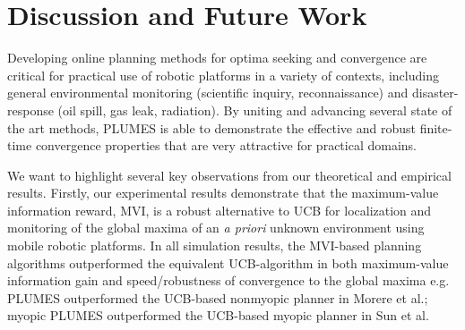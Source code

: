 \documentclass{styles/svproc}
\begin{document}
\section{Discussion and Future Work}
\label{sec:discussion}
Developing online planning methods for optima seeking and convergence are critical for practical use of robotic platforms in a variety of contexts, including general environmental monitoring (scientific inquiry, reconnaissance) and disaster-response (oil spill, gas leak, radiation). By uniting and advancing several state of the art methods, PLUMES is able to demonstrate the effective and robust finite-time convergence properties that are very attractive for practical domains. 

We want to highlight several key observations from our theoretical and empirical results. Firstly, our experimental results demonstrate that the maximum-value information reward, MVI, is a robust alternative to UCB for localization and monitoring of the global maxima of an \textit{a priori} unknown environment using mobile robotic platforms. In all simulation results, the MVI-based planning algorithms outperformed the equivalent UCB-algorithm in both maximum-value information gain and speed/robustness of convergence to the global maxima e.g. PLUMES outperformed the UCB-based nonmyopic planner in Morere et al.; myopic PLUMES outperformed the UCB-based myopic planner in Sun et al.
\end{document}
